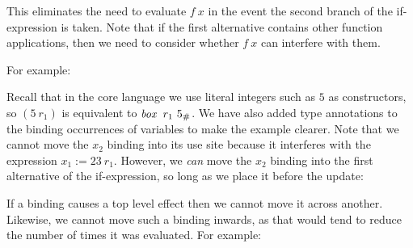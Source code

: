 
This eliminates the need to evaluate $f \ x$ in the event the second branch of the if-expression is taken. Note that if the first alternative contains other function applications, then we need to consider whether $f \ x$ can interfere with them. 

\clearpage{}
For example:


Recall that in the core language we use literal integers such as $5$ as constructors, so $(5 \ r_1)$ is equivalent to $\operatorname{\mathit{box}} \ r_1 \ 5_\#$. We have also added type annotations to the binding occurrences of variables to make the example clearer. Note that we cannot move the $x_2$ binding into its use site because it interferes with the expression \mbox{$x_1 := 23 \ r_1$}. However, we \emph{can} move the $x_2$ binding into the first alternative of the if-expression, so long as we place it before the update:


If a binding causes a top level effect then we cannot move it across another. Likewise, we cannot move such a binding inwards, as that would tend to reduce the number of times it was evaluated. For example:

